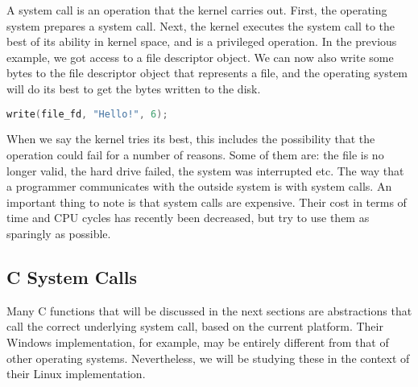 A system call is an operation that the kernel carries out.
First, the operating system prepares a system call.
Next, the kernel executes the system call to the best of its ability in kernel space, and is a privileged operation.
In the previous example, we got access to a file descriptor object.
We can now also write some bytes to the file descriptor object that represents a file, and the operating system will do its best to get the bytes written to the disk.

\begin{lstlisting}[language=C]
write(file_fd, "Hello!", 6);
\end{lstlisting}

When we say the kernel tries its best, this includes the possibility that the operation could fail for a number of reasons.
Some of them are: the file is no longer valid, the hard drive failed, the system was interrupted etc.
The way that a programmer communicates with the outside system is with system calls.
An important thing to note is that system calls are expensive.
Their cost in terms of time and CPU cycles has recently been decreased, but try to use them as sparingly as possible.

\subsection{C System Calls}

Many C functions that will be discussed in the next sections are abstractions that call the correct underlying system call, based on the current platform. 
Their Windows implementation, for example, may be entirely different from that of other operating systems.
Nevertheless, we will be studying these in the context of their Linux implementation.

